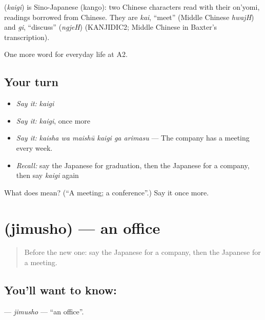 \begin{cousinweb}
\textbf{} (\emph{kaigi}) is Sino-Japanese (kango): two Chinese characters read with their on'yomi, readings borrowed from Chinese. They are \emph{kai}, \textquotedblleft{}meet\textquotedblright{} (Middle Chinese \emph{hwajH}) and \emph{gi}, \textquotedblleft{}discuss\textquotedblright{} (\emph{ngjeH}) (KANJIDIC2; Middle Chinese in Baxter's transcription).
\end{cousinweb}

\begin{grammarlens}[title={What you've built}]
One more word for everyday life at A2.
\end{grammarlens}

\subsection*{Your turn}
\begin{itemize}
\raggedright
  \item \emph{Say it:} \emph{kaigi}
  \item \emph{Say it:} \emph{kaigi}, once more
  \item \emph{Say it:} \emph{kaisha wa maishū kaigi ga arimasu} — The company has a meeting every week.
  \item \emph{Recall:} say the Japanese for graduation, then the Japanese for a company, then say \emph{kaigi} again
\end{itemize}

\begin{tcolorbox}[breakable,colback=teal!4,colframe=teal!35!black,title={Before you move on}]
What does  mean? (\textquotedblleft{}A meeting; a conference\textquotedblright{}.) Say it once more.
\end{tcolorbox}
\section[\texorpdfstring{\ja{じむしょ} (jimusho)}{じむしょ (jimusho)}]{ (jimusho) — an office}

\label{lesson:JA-C229-jimusho}



\begin{quote}
Before the new one: say the Japanese for a company, then the Japanese for a meeting.
\end{quote}

\subsection*{You'll want to know: }
\textbf{} — \emph{jimusho} — \textquotedblleft{}an office\textquotedblright{}.

